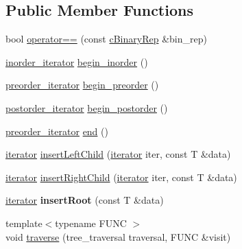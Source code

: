 \subsection*{Public Member Functions}
\begin{DoxyCompactItemize}
\item 
bool \hyperlink{classtree_1_1cBinaryRep_a7a8f861470cb8538aa03ddbb9cbac6af}{operator==} (const \hyperlink{classtree_1_1cBinaryRep}{c\-Binary\-Rep} \&bin\-\_\-rep)
\item 
\hyperlink{classtree_1_1btree__inorder__iterator}{inorder\-\_\-iterator} \hyperlink{classtree_1_1cBinaryRep_a5701848a04cd825236bc125b33e376d8}{begin\-\_\-inorder} ()
\item 
\hyperlink{classtree_1_1btree__preorder__iterator}{preorder\-\_\-iterator} \hyperlink{classtree_1_1cBinaryRep_a6e912be346d3626156df92eabecee012}{begin\-\_\-preorder} ()
\item 
\hyperlink{classtree_1_1btree__postorder__iterator}{postorder\-\_\-iterator} \hyperlink{classtree_1_1cBinaryRep_a99f4029023bc6b07fade450aceb2f17d}{begin\-\_\-postorder} ()
\item 
\hyperlink{classtree_1_1btree__preorder__iterator}{preorder\-\_\-iterator} \hyperlink{classtree_1_1cBinaryRep_acf645e7e2447eb801c71ac752ecede22}{end} ()
\item 
\hyperlink{classtree_1_1btree__iterator}{iterator} \hyperlink{classtree_1_1cBinaryRep_a1bd7a582b25b1f7a4ff76ea936377458}{insert\-Left\-Child} (\hyperlink{classtree_1_1btree__iterator}{iterator} iter, const T \&data)
\item 
\hyperlink{classtree_1_1btree__iterator}{iterator} \hyperlink{classtree_1_1cBinaryRep_a593596cea8e60e85a0f66fb3354617a8}{insert\-Right\-Child} (\hyperlink{classtree_1_1btree__iterator}{iterator} iter, const T \&data)
\item 
\hypertarget{classtree_1_1cBinaryRep_aae971b4e02baaa0c4d51ce1416ca2178}{\hyperlink{classtree_1_1btree__iterator}{iterator} {\bfseries insert\-Root} (const T \&data)}\label{classtree_1_1cBinaryRep_aae971b4e02baaa0c4d51ce1416ca2178}

\item 
{\footnotesize template$<$typename F\-U\-N\-C $>$ }\\void \hyperlink{classtree_1_1cBinaryRep_aebf973eb7334a5cf2134a51ebc519d33}{traverse} (tree\-\_\-traversal traversal, F\-U\-N\-C \&visit)
\end{DoxyCompactItemize}
